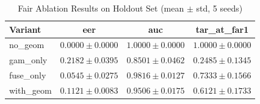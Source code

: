 \begin{table}[h]
\centering
\caption{Fair Ablation Results on Holdout Set (mean $\pm$ std, 5 seeds)}
\begin{tabular}{lccc}
\hline
Variant & eer & auc & tar_at_far1 \\
\hline
no\_geom & $0.0000 \pm 0.0000$ & $1.0000 \pm 0.0000$ & $1.0000 \pm 0.0000$ \\
gam\_only & $0.2182 \pm 0.0395$ & $0.8501 \pm 0.0462$ & $0.2485 \pm 0.1345$ \\
fuse\_only & $0.0545 \pm 0.0275$ & $0.9816 \pm 0.0127$ & $0.7333 \pm 0.1566$ \\
with\_geom & $0.1121 \pm 0.0083$ & $0.9506 \pm 0.0175$ & $0.6121 \pm 0.1733$ \\
\hline
\end{tabular}
\end{table}